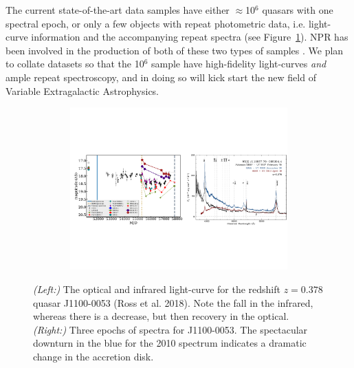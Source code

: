\documentclass[oneside, a4paper, onecolumn, 11pt]{article}
\begin{document}
\smallskip
\noindent
The current state-of-the-art data samples have either
$\approx$10$^{6}$ quasars with one spectral epoch, or only a few
objects with repeat photometric data, i.e. light-curve information and
the accompanying repeat spectra (see Figure~\ref{fig:J110057}).  NPR
has been involved in the production of both of these two types of
samples \citep{MacLeod2016, Paris2017}. We plan to collate datasets so
that the 10$^{6}$ sample have high-fidelity light-curves {\it and}
ample repeat spectroscopy, and in doing so will kick start the new
field of Variable Extragalactic Astrophysics.


\begin{figure}[h]
  \begin{center}
    \hspace{-0.5cm}
    \includegraphics[height=6.25cm,width=17.2cm]
    {figures/J110057_LC_Spectra_20171024.pdf}
    \vspace{-10pt}
    \caption{%
      \footnotesize 
      {\it (Left:)} The optical and infrared light-curve for the redshift $z=0.378$ quasar 
      J1100-0053 (Ross et al. 2018). 
      Note the fall in the infrared, whereas there is a decrease, but 
      then recovery in the optical. 
      {\it (Right:)} 
      Three epochs of spectra for J1100-0053. 
      The spectacular downturn in the blue for the 2010 spectrum 
      indicates a dramatic change in the accretion disk.
    }
  \vspace{-16pt}
 \label{fig:J110057}
\end{center}
\end{figure}
\end{document}
